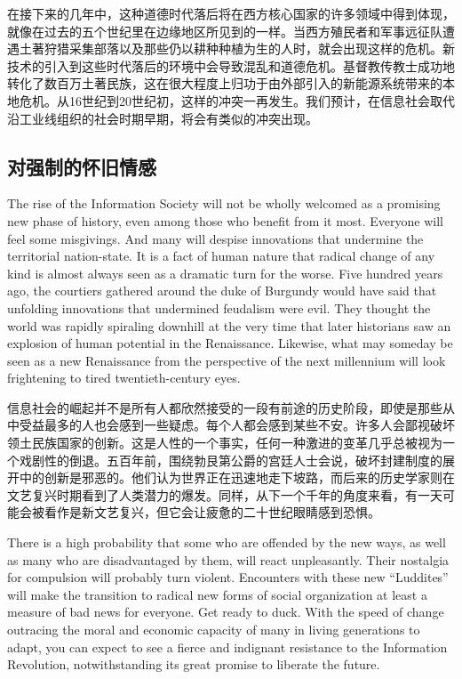 \begin{paracol}{2}[]
\switchcolumn
在接下来的几年中，这种道德时代落后将在西方核心国家的许多领域中得到体现，就像在过去的五个世纪里在边缘地区所见到的一样。当西方殖民者和军事远征队遭遇土著狩猎采集部落以及那些仍以耕种种植为生的人时，就会出现这样的危机。新技术的引入到这些时代落后的环境中会导致混乱和道德危机。基督教传教士成功地转化了数百万土著民族，这在很大程度上归功于由外部引入的新能源系统带来的本地危机。从16世纪到20世纪初，这样的冲突一再发生。我们预计，在信息社会取代沿工业线组织的社会时期早期，将会有类似的冲突出现。

\end{paracol}

\subsection{对强制的怀旧情感}
\begin{paracol}{2}[]
The rise of the Information Society will not be wholly welcomed as a promising new phase of history, even among those who benefit from it most. Everyone will feel some misgivings. And many will despise innovations that undermine the territorial nation-state. It is a fact of human nature that radical change of any kind is almost always seen as a dramatic turn for the worse. Five hundred years ago, the courtiers gathered around the duke of Burgundy would have said that unfolding innovations that undermined feudalism were evil. They thought the world was rapidly spiraling downhill at the very time that later historians saw an explosion of human potential in the Renaissance. Likewise, what may someday be seen as a new Renaissance from the perspective of the next millennium will look frightening to tired twentieth-century eyes.

\switchcolumn
信息社会的崛起并不是所有人都欣然接受的一段有前途的历史阶段，即使是那些从中受益最多的人也会感到一些疑虑。每个人都会感到某些不安。许多人会鄙视破坏领土民族国家的创新。这是人性的一个事实，任何一种激进的变革几乎总被视为一个戏剧性的倒退。五百年前，围绕勃艮第公爵的宫廷人士会说，破坏封建制度的展开中的创新是邪恶的。他们认为世界正在迅速地走下坡路，而后来的历史学家则在文艺复兴时期看到了人类潜力的爆发。同样，从下一个千年的角度来看，有一天可能会被看作是新文艺复兴，但它会让疲惫的二十世纪眼睛感到恐惧。

\switchcolumn*
There is a high probability that some who are offended by the new ways, as well as many who are disadvantaged by them, will react unpleasantly. Their nostalgia for compulsion will probably turn violent. Encounters with these new ``Luddites'' will make the transition to radical new forms of social organization at least a measure of bad news for everyone. Get ready to duck. With the speed of change outracing the moral and economic capacity of many in living generations to adapt, you can expect to see a fierce and indignant resistance to the Information Revolution, notwithstanding its great promise to liberate the future.



\end{paracol}
